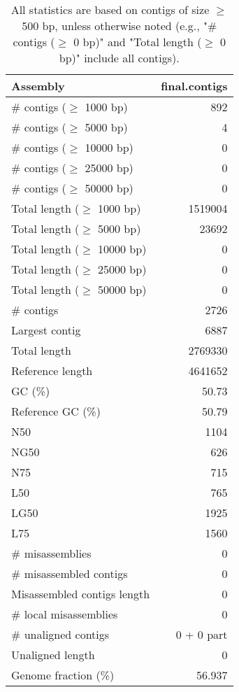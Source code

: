 \documentclass[12pt,a4paper]{article}
\begin{document}
\begin{table}[ht]
\begin{center}
\caption{All statistics are based on contigs of size $\geq$ 500 bp, unless otherwise noted (e.g., "\# contigs ($\geq$ 0 bp)" and "Total length ($\geq$ 0 bp)" include all contigs).}
\begin{tabular}{|l*{1}{|r}|}
\hline
Assembly & final.contigs \\ \hline
\# contigs ($\geq$ 1000 bp) & 892 \\ \hline
\# contigs ($\geq$ 5000 bp) & 4 \\ \hline
\# contigs ($\geq$ 10000 bp) & 0 \\ \hline
\# contigs ($\geq$ 25000 bp) & 0 \\ \hline
\# contigs ($\geq$ 50000 bp) & 0 \\ \hline
Total length ($\geq$ 1000 bp) & 1519004 \\ \hline
Total length ($\geq$ 5000 bp) & 23692 \\ \hline
Total length ($\geq$ 10000 bp) & 0 \\ \hline
Total length ($\geq$ 25000 bp) & 0 \\ \hline
Total length ($\geq$ 50000 bp) & 0 \\ \hline
\# contigs & 2726 \\ \hline
Largest contig & 6887 \\ \hline
Total length & 2769330 \\ \hline
Reference length & 4641652 \\ \hline
GC (\%) & 50.73 \\ \hline
Reference GC (\%) & 50.79 \\ \hline
N50 & 1104 \\ \hline
NG50 & 626 \\ \hline
N75 & 715 \\ \hline
L50 & 765 \\ \hline
LG50 & 1925 \\ \hline
L75 & 1560 \\ \hline
\# misassemblies & 0 \\ \hline
\# misassembled contigs & 0 \\ \hline
Misassembled contigs length & 0 \\ \hline
\# local misassemblies & 0 \\ \hline
\# unaligned contigs & 0 + 0 part \\ \hline
Unaligned length & 0 \\ \hline
Genome fraction (\%) & 56.937 \\ \hline

\end{tabular}
\end{center}
\end{table}
\end{document}
